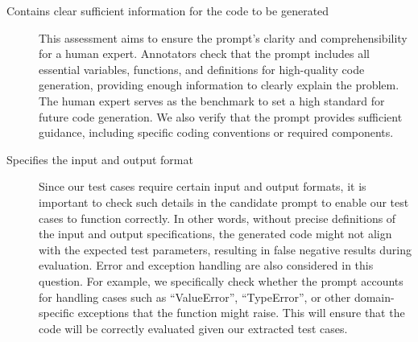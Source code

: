 \begin{description}
\item[Contains clear sufficient information for the code to be generated]
This assessment aims to ensure the prompt’s clarity and comprehensibility for a human expert. Annotators check that the prompt includes all essential variables, functions, and definitions for high-quality code generation, providing enough information to clearly explain the problem. The human expert serves as the benchmark to set a high standard for future code generation. We also verify that the prompt provides sufficient guidance, including specific coding conventions or required components.


\item[Specifies the input and output format]
Since our test cases require certain input and output formats, it is important to check such details in the candidate prompt to enable our test cases to function correctly\cite{sahoo2024systematic, chen2024using}. In other words, without precise definitions of the input and output specifications, the generated code might not align with the expected test parameters, resulting in false negative results during evaluation. Error and exception handling are also considered in this question. For example, we specifically check whether the prompt accounts for handling cases such as ``ValueError'', ``TypeError'', or other domain-specific exceptions that the function might raise. This will ensure that the code will be correctly evaluated given our extracted test cases.




\end{description}
